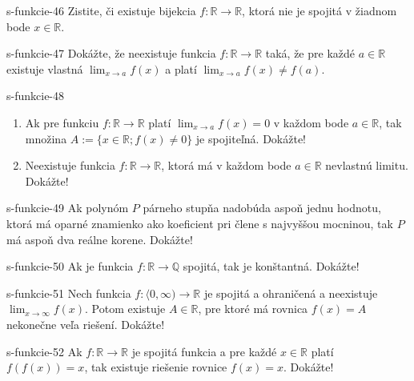 \begin{defproblem}{s-funkcie-46}
Zistite, či existuje bijekcia $f: \mathbb{R} \rightarrow \mathbb{R}$, ktorá nie je spojitá v žiadnom bode $x \in \mathbb{R}$.
\end{defproblem}

\begin{defproblem}{s-funkcie-47}
Dokážte, že neexistuje funkcia $f: \mathbb{R} \rightarrow \mathbb{R}$ taká, že pre každé $a \in \mathbb{R}$ existuje vlastná $\lim_{x \rightarrow a}f(x)$ a platí $\lim_{x \rightarrow a}f(x) \neq f(a)$.
\end{defproblem}

\begin{defproblem}{s-funkcie-48}
\begin{enumerate}
\item Ak pre funkciu $f: \mathbb{R} \rightarrow \mathbb{R}$ platí $\lim_{x \rightarrow a}f(x)=0$ v každom bode $a \in \mathbb{R}$, tak množina $A:=\{x \in \mathbb{R};f(x)\neq 0\}$ je spojiteľná. Dokážte!
\item Neexistuje funkcia $f: \mathbb{R} \rightarrow \mathbb{R}$, ktorá má v každom bode $a \in \mathbb{R}$ nevlastnú limitu. Dokážte!
\end{enumerate}
\end{defproblem}

\begin{defproblem}{s-funkcie-49}
Ak polynóm $P$ párneho stupňa nadobúda aspoň jednu hodnotu, ktorá má oparné znamienko ako koeficient pri člene s najvyššou mocninou, tak $P$ má aspoň dva reálne korene. Dokážte!
\end{defproblem}

\begin{defproblem}{s-funkcie-50}
Ak je funkcia $f: \mathbb{R} \rightarrow \mathbb{Q}$ spojitá, tak je konštantná. Dokážte!
\end{defproblem}

\begin{defproblem}{s-funkcie-51}
Nech funkcia $f: \langle 0, \infty) \rightarrow \mathbb{R}$ je spojitá a ohraničená a neexistuje $\lim_{x \rightarrow \infty}f(x)$. Potom existuje $A \in \mathbb{R}$, pre ktoré má rovnica $f(x)=A$ nekonečne veľa riešení. Dokážte!
\end{defproblem}

\begin{defproblem}{s-funkcie-52}
Ak $f: \mathbb{R} \rightarrow \mathbb{R}$ je spojitá funkcia a pre každé $x \in \mathbb{R}$ platí $f(f(x))=x$, tak existuje riešenie rovnice $f(x)=x$. Dokážte!
\end{defproblem}

